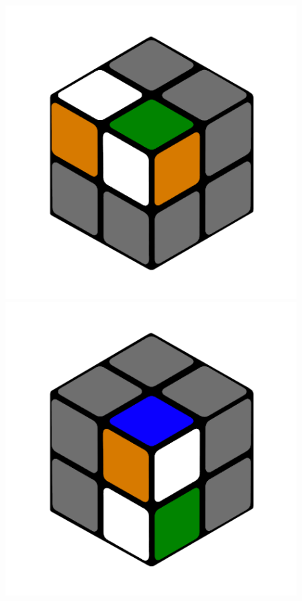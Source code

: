 \documentclass[12pt,a4paper, usenames, dvipsnames]{article}
\theoremstyle{mystyle}
\theoremstyle{definition}
\begin{document}
\begin{figure}[H]
\centering
\includegraphics[scale=0.1]{e1_s2_s1_s.png}
\includegraphics[scale=0.1]{e1_s2_s2_s.png}

\end{figure}
\end{document}

